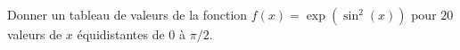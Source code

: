 \begin{exercice}\label{exoSC_serie2-0003}

	Donner un tableau de valeurs de la fonction $f(x)=\exp(\sin^2(x))$ pour $20$ valeurs de $x$ équidistantes de $0$ à $\pi/2$.

\end{exercice}
